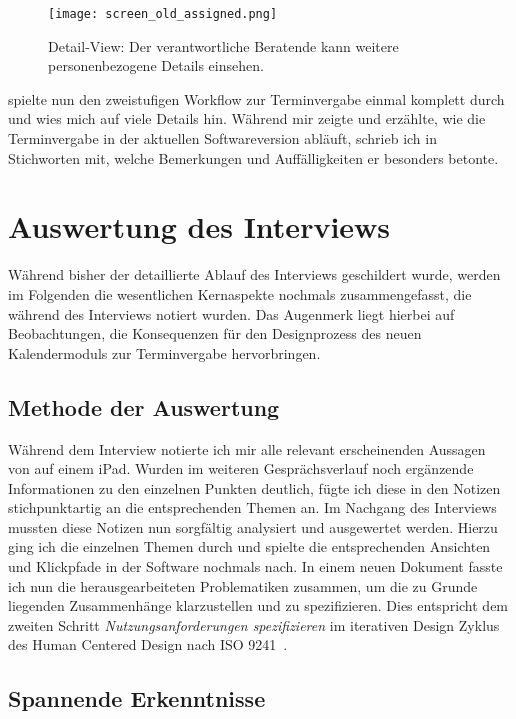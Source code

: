 \begin{figure}[H]
    \caption{Detail-View: Der verantwortliche Beratende kann weitere personenbezogene Details einsehen.}
    \centering
    \texttt{[image: screen\_old\_assigned.png]}
\end{figure}

\ipName spielte nun den zweistufigen Workflow zur Terminvergabe einmal komplett
durch und wies mich auf viele Details hin. Während \ipName mir
zeigte und erzählte, wie die Terminvergabe in der aktuellen Softwareversion
abläuft, schrieb ich in Stichworten mit, welche Bemerkungen und
Auffälligkeiten er besonders betonte.

\section{Auswertung des Interviews}

Während bisher der detaillierte Ablauf des Interviews geschildert wurde, werden
im Folgenden die wesentlichen Kernaspekte nochmals zusammengefasst, die während
des Interviews notiert wurden. Das Augenmerk liegt hierbei auf Beobachtungen,
die Konsequenzen für den Designprozess des neuen Kalendermoduls zur
Terminvergabe hervorbringen.

\subsection*{Methode der Auswertung}
Während dem Interview notierte ich mir alle relevant erscheinenden Aussagen von
\ipName auf einem iPad. Wurden im weiteren Gesprächsverlauf noch ergänzende
Informationen zu den einzelnen Punkten deutlich, fügte ich diese in den Notizen
stichpunktartig an die entsprechenden Themen an. Im Nachgang des Interviews
mussten diese Notizen nun sorgfältig analysiert und ausgewertet werden. Hierzu
ging ich die einzelnen Themen durch und spielte die entsprechenden Ansichten
und Klickpfade in der Software nochmals nach. In einem neuen Dokument fasste
ich nun die herausgearbeiteten Problematiken zusammen, um die zu Grunde
liegenden Zusammenhänge klarzustellen und zu spezifizieren. Dies entspricht dem
zweiten Schritt \textit{Nutzungsanforderungen spezifizieren} im iterativen
Design Zyklus des Human Centered Design nach ISO 9241~\cite{ISO9241}.

\subsection*{Spannende Erkenntnisse}
\label{subsection:SpannendeErkenntnisse}

